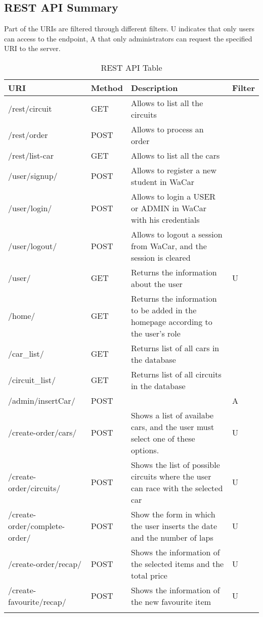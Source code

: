 \subsection{REST API Summary}

Part of the URIs are filtered through different filters. U indicates that only users can access to the endpoint,
A that only administrators can request the specified URI to the server.

\begin{longtable}{|p{}|p{} |p{}|p{}|} 
\hline
\textbf{URI} & \textbf{Method} & \textbf{Description} & \textbf{Filter} \\\hline
/rest/circuit & GET & Allows to list all the circuits \\\hline
/rest/order & POST & Allows to process an order \\\hline
/rest/list-car & GET & Allows to list all the cars \\\hline
/user/signup/  & POST &  Allows to register a new student in WaCar & \\\hline
/user/login/  & POST &  Allows to login a USER or ADMIN in WaCar with his credentials & \\\hline
/user/logout/  & POST &  Allows to logout a session from WaCar, and the session is cleared & \\\hline
/user/ & GET &  Returns the information about the user & U \\\hline
/home/  & GET &  Returns the information to be added in the homepage according to the user's role & \\\hline
/car\_list/  & GET &  Returns list of all cars in the database & \\\hline
/circuit\_list/  & GET &  Returns list of all circuits in the database & \\\hline
/admin/insertCar/ & POST &   & A\\\hline
/create-order/cars/ & POST & Shows a list of availabe cars, and the user must select one of these options. & U\\\hline
/create-order/circuits/ & POST & Shows the list of possible circuits where the user can race with the selected car & U\\\hline
/create-order/complete-order/ & POST & Show the form in which the user inserts the date and the number of laps & U\\\hline
/create-order/recap/ & POST & Shows the information of the selected items and the total price & U\\\hline
/create-favourite/recap/ & POST & Shows the information of the new favourite item & U\\\hline

\caption{REST API Table}
\label{tab:termGlossary}
\end{longtable}